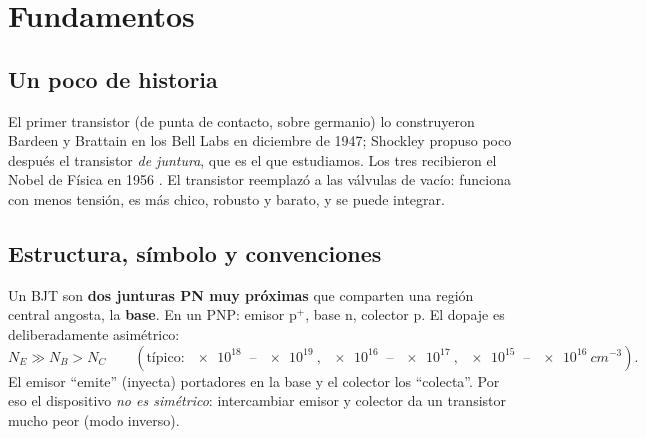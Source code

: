 \section{Fundamentos}

\subsection{Un poco de historia}

El primer transistor (de punta de contacto, sobre germanio) lo construyeron Bardeen y
Brattain en los Bell Labs en diciembre de 1947; Shockley propuso poco después el
transistor \emph{de juntura}, que es el que estudiamos. Los tres recibieron el Nobel de
Física en 1956 . El transistor reemplazó a las válvulas de vacío: funciona con
menos tensión, es más chico, robusto y barato, y se puede integrar.

\subsection{Estructura, símbolo y convenciones}

Un BJT son \textbf{dos junturas PN muy próximas} que comparten una región central angosta,
la \textbf{base}. En un PNP: emisor p$^+$, base n, colector p. El dopaje es deliberadamente
asimétrico:
\[
  N_E \gg N_B > N_C
  \qquad(\text{típico: } \SI{e18}{} \text{ -- } \SI{e19}{},\ \SI{e16}{} \text{ -- } \SI{e17}{},\
  \SI{e15}{} \text{ -- } \SI{e16}{cm^{-3}}).
\]
El emisor ``emite'' (inyecta) portadores en la base y el colector los ``colecta''. Por eso
el dispositivo \emph{no es simétrico}: intercambiar emisor y colector da un transistor mucho
peor (modo inverso).

